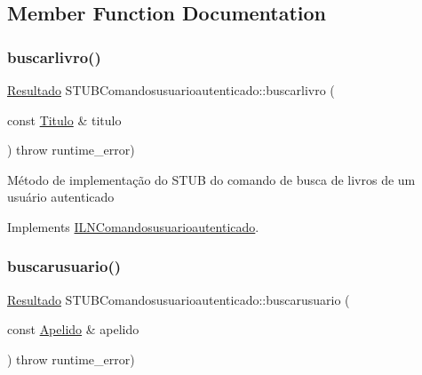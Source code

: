 \subsection{Member Function Documentation}
\mbox{\label{classSTUBComandosusuarioautenticado_a12f684d2240412050e6eee54ebdd1a57}} 
\subsubsection{\texorpdfstring{buscarlivro()}{buscarlivro()}}
{\footnotesize\ttfamily \hyperlink{classResultado}{Resultado} S\+T\+U\+B\+Comandosusuarioautenticado\+::buscarlivro (\begin{DoxyParamCaption}\item[{const \hyperlink{classTitulo}{Titulo} \&}]{titulo }\end{DoxyParamCaption}) throw  runtime\+\_\+error) \hspace{0.3cm}{\ttfamily [virtual]}}

Método de implementação do S\+T\+UB do comando de busca de livros de um usuário autenticado 

Implements \hyperlink{classILNComandosusuarioautenticado}{I\+L\+N\+Comandosusuarioautenticado}.

\mbox{\label{classSTUBComandosusuarioautenticado_ad156d9cd3554e120bc8fff5916955465}} 
\subsubsection{\texorpdfstring{buscarusuario()}{buscarusuario()}}
{\footnotesize\ttfamily \hyperlink{classResultado}{Resultado} S\+T\+U\+B\+Comandosusuarioautenticado\+::buscarusuario (\begin{DoxyParamCaption}\item[{const \hyperlink{classApelido}{Apelido} \&}]{apelido }\end{DoxyParamCaption}) throw  runtime\+\_\+error) \hspace{0.3cm}{\ttfamily [virtual]}}

